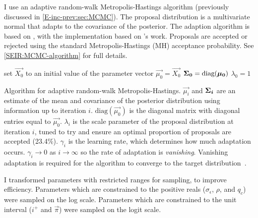 \documentclass[thesis.tex]{subfiles}
\begin{document}
I use an adaptive random-walk Metropolis-Hastings algorithm (previously discussed in \cref{E-inc-prev:sec:MCMC}).
The proposal distribution is a multivariate normal that adapts to the covariance of the posterior.
The adaption algorithm is based on \textcite[algorithm 4]{andrieuTutorial}, with the implementation based on \textcite{ghoshApproximate}'s work.
Proposals are accepted or rejected using the standard Metropolis-Hastings (MH) acceptance probability.
See \cref{SEIR:MCMC-algorithm} for full details.
\begin{algorithm}
 set $\vec{X_0}$ to an initial value of the parameter vector \;
 $\vec{\mu_0} = \vec{X_0}$ \;
 $\bm{\Sigma_0} = \text{diag}(\bm{\mu_0})$ \;
 $\lambda_0 = 1$ \;
 \caption{Algorithm for adaptive random-walk Metropolis-Hastings. $\vec{\mu_i}$ and $\bm{\Sigma_i}$ are an estimate of the mean and covariance of the posterior distribution using information up to iteration $i$. $\text{diag}(\vec{\mu_0})$ is the diagonal matrix with diagonal entries equal to $\vec{\mu_0}$. $\lambda_i$ is the scale parameter of the proposal distribution at iteration $i$, tuned to try and ensure an optimal proportion of proposals are accepted (23.4\%). $\gamma_i$ is the learning rate, which determines how much adaptation occurs. $\gamma_i \to 0$ as $i \to \infty$ so the rate of adaptation is \emph{vanishing}. Vanishing adaptation is required for the algorithm to converge to the target distribution~\autocite[section 3]{andrieuTutorial}.}
 \label{SEIR:MCMC-algorithm}
\end{algorithm}

I transformed parameters with restricted ranges for sampling, to improve efficiency.
Parameters which are constrained to the positive reals ($\sigma_\epsilon$, $\rho$, and $q_c$) were sampled on the log scale.
Parameters which are constrained to the unit interval ($i^+$ and $\vec{\pi}$) were sampled on the logit scale.
\end{document}
